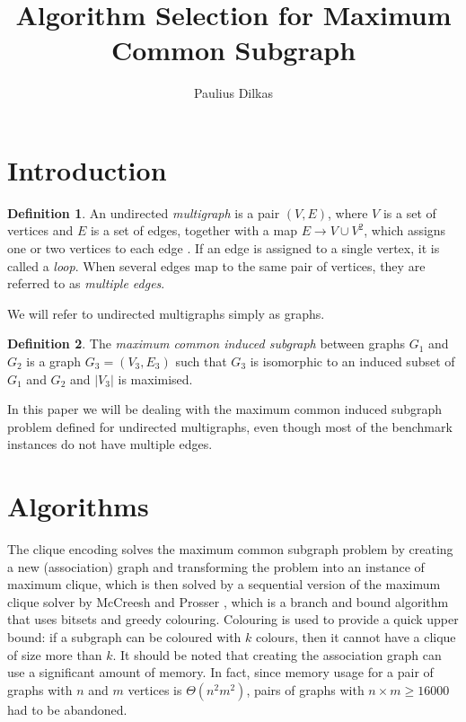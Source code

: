 \documentclass{article}
\author{Paulius Dilkas}
\title{Algorithm Selection for Maximum Common Subgraph}
\theoremstyle{definition}
\newtheorem{definition}{Definition}[section]
\theoremstyle{remark}
\begin{document}
\maketitle

\section{Introduction}
\begin{definition}
  An undirected \emph{multigraph} is a pair $(V, E)$, where $V$ is a set of
  vertices and $E$ is a set of edges, together with a map $E \to V \cup V^2$,
  which assigns one or two vertices to each edge
  \cite{DBLP:books/daglib/0030488}. If an edge is assigned to a single vertex,
  it is called a \emph{loop}. When several edges map to the same pair of
  vertices, they are referred to as \emph{multiple edges}. 
\end{definition}

We will refer to undirected multigraphs simply as graphs.

\begin{definition}
  The \emph{maximum common induced subgraph} between graphs $G_1$ and $G_2$ is a
  graph $G_3 = (V_3, E_3)$ such that $G_3$ is isomorphic to an induced subset of
  $G_1$ and $G_2$ and $|V_3|$ is maximised.
\end{definition}
In this paper we will be dealing with the maximum common induced subgraph
problem defined for undirected multigraphs, even though most of the benchmark
instances do not have multiple edges.

\section{Algorithms}
The clique encoding \cite{DBLP:conf/cp/McCreeshNPS16} solves the maximum common
subgraph problem by creating a new (association) graph and transforming the
problem into an instance of maximum clique, which is then solved by a sequential
version of the maximum clique solver by McCreesh and Prosser
\cite{DBLP:journals/topc/McCreeshP15}, which is a branch and bound algorithm
that uses bitsets and greedy colouring. Colouring is used to provide a quick
upper bound: if a subgraph can be coloured with $k$ colours, then it cannot have
a clique of size more than $k$. It should be noted that creating the association
graph can use a significant amount of memory. In fact, since memory usage for a
pair of graphs with $n$ and $m$ vertices is $\Theta(n^2m^2)$, pairs of graphs
with $n \times m \ge 16000 $ had to be abandoned. %
\end{document}

